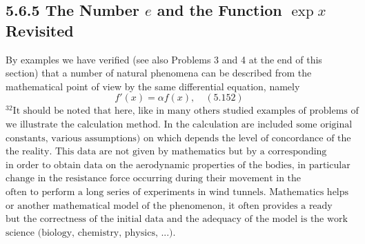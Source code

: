 \subsection{5.6.5 The Number $e$ and the Function $\exp x$ Revisited}
By examples we have verified (see also Problems 3 and 4 at the end of this section)
that a number of natural phenomena can be described from the mathematical point
of view by the same differential equation, namely
$$f'(x) = \alpha f(x), \quad (5.152)$$
$^{32}\text{It should be noted that here, like in many others studied examples of problems of natural science,}$
$\text{we illustrate the calculation method. In the calculation are included some original data (empirical}$
$\text{constants, various assumptions) on which depends the level of concordance of the calculations with}$
$\text{the reality. This data are not given by mathematics but by a corresponding science. For example,}$
$\text{in order to obtain data on the aerodynamic properties of the bodies, in particular the nature of the}$
$\text{change in the resistance force occurring during their movement in the atmosphere, it is necessary}$
$\text{often to perform a long series of experiments in wind tunnels. Mathematics helps to calculate one}$
$\text{or another mathematical model of the phenomenon, it often provides a ready calculation procedure,}$
$\text{but the correctness of the initial data and the adequacy of the model is the work of another relevant}$
$\text{science (biology, chemistry, physics, ...).}$